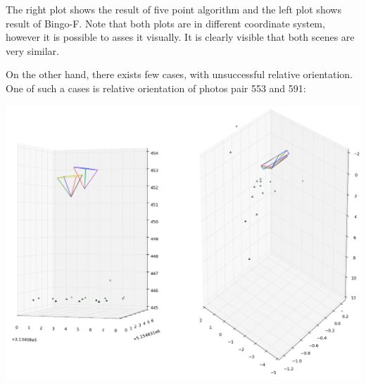 \documentclass[a4paper,12pt]{article}
\begin{document}
The right plot shows the result of five point algorithm and the left plot shows result of Bingo-F. Note that both 
plots are in different coordinate system, however it is possible to asses it visually. It is clearly visible
that both scenes are very similar.

On the other hand, there exists  few cases, with unsuccessful relative orientation.  
One of such a cases is relative orientation of photos pair 553 and 591:  


\includegraphics[scale=0.4]{figures/rel_or_553_591.png}
\end{document}

